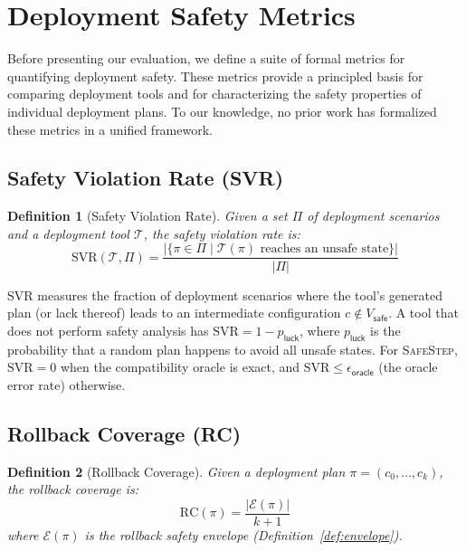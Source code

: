 \documentclass[10pt,twocolumn]{article}
\newtheorem{definition}{Definition}
\newcommand{\safestep}{\textsc{SafeStep}}
\begin{document}
\section{Deployment Safety Metrics}
\label{sec:metrics}

Before presenting our evaluation, we define a suite of formal
metrics for quantifying deployment safety. These metrics provide
a principled basis for comparing deployment tools and for
characterizing the safety properties of individual deployment
plans. To our knowledge, no prior work has formalized these
metrics in a unified framework.

\subsection{Safety Violation Rate (SVR)}

\begin{definition}[Safety Violation Rate]
Given a set $\Pi$ of deployment scenarios and a deployment tool
$\mathcal{T}$, the \emph{safety violation rate} is:
\[
  \mathrm{SVR}(\mathcal{T}, \Pi) = \frac{|\{\pi \in \Pi \mid
  \mathcal{T}(\pi) \text{ reaches an unsafe state}\}|}{|\Pi|}
\]
\end{definition}

SVR measures the fraction of deployment scenarios where the
tool's generated plan (or lack thereof) leads to an intermediate
configuration $c \notin V_{\mathsf{safe}}$. A tool that does
not perform safety analysis has $\mathrm{SVR} = 1 - p_{\mathsf{luck}}$,
where $p_{\mathsf{luck}}$ is the probability that a random
plan happens to avoid all unsafe states. For \safestep{},
$\mathrm{SVR} = 0$ when the compatibility oracle is exact,
and $\mathrm{SVR} \leq \epsilon_{\mathsf{oracle}}$ (the oracle
error rate) otherwise.

\subsection{Rollback Coverage (RC)}

\begin{definition}[Rollback Coverage]
Given a deployment plan $\pi = (c_0, \ldots, c_k)$, the
\emph{rollback coverage} is:
\[
  \mathrm{RC}(\pi) = \frac{|\mathcal{E}(\pi)|}{k + 1}
\]
where $\mathcal{E}(\pi)$ is the rollback safety envelope
(Definition~\ref{def:envelope}).
\end{definition}
\end{document}
